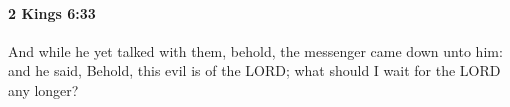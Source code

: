 
		\paragraph{2 Kings 6:33} %
			\label{2KINGS-6-33}

			And while he yet talked with them, behold, the messenger came down unto him: and he said, Behold, this evil is of the LORD; what should I wait for the LORD any longer?

